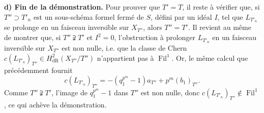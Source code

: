 \documentclass[12pt,a4paper]{article}
\theoremstyle{plain}
\theoremstyle{definition}
\theoremstyle{remark}
\DeclareMathOperator{\Fil}{Fil}
\begin{document}
\textbf{d) Fin de la d\'emonstration.} Pour prouver que $T' = T$, il reste \`a v\'erifier que, si $T'' \supset T'_n$ est un sous-sch\'ema formel ferm\'e de $S$, d\'efini par un id\'eal $I$, tel que $L_{T'_n}$ se prolonge en un faisceau inversible sur $X_{T''}$, alors $T'' = T'$. Il revient au m\^eme de montrer que, si $T'' \supsetneqq T'$ et $I^2 = 0$, l'obstruction \`a prolonger $L_{T'_n}$ en un faisceau inversible sur $X_{T''}$ est non nulle, i.e. que la classe de Chern $c(L_{T'_n})_{T''} \in H^2_\mathrm{dR}(X_{T''}/T'')$ n'appartient pas \`a $\Fil^1$. Or, le m\^eme calcul que pr\'ec\'edemment fournit
\[
c(L_{T'_n})_{T''} = -(q_1^{p^m} - 1)a_{T''} + p^m (b_1)_{T''}.
\]
Comme $T'' \supsetneqq T'$, l'image de $q_1^{p^m} - 1$ dans $T''$ est non nulle, donc $c(L_{T'_n})_{T''} \notin \Fil^1$, ce qui ach\`eve la d\'emonstration.
\end{document}
